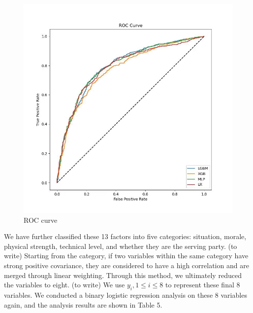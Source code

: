 \documentclass{mcmthesis}
\begin{document}
\begin{figure}[h]
\centering
\includegraphics[width=12cm]{figures/ROC.jpg}
\caption{ROC curve} \label{fig:aa}
\end{figure}

We have further classified these 13 factors into five categories: situation, morale, physical strength, technical level, and whether they are the serving party. (to write) Starting from the category, if two variables within the same category have strong positive covariance, they are considered to have a high correlation and are merged through linear weighting. Through this method, we ultimately reduced the variables to eight. (to write) We use $y_i,1\leq i\leq8$ to represent these final 8 variables. We conducted a binary logistic regression analysis on these 8 variables again, and the analysis results are shown in Table 5. 
\end{document}
